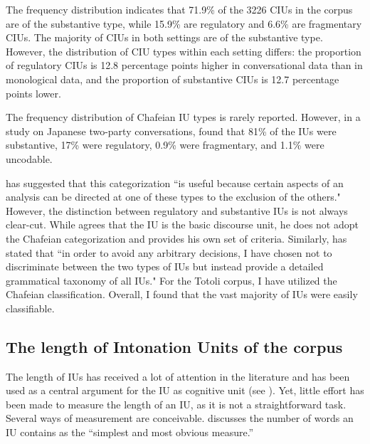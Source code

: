 The frequency distribution indicates that 71.9\% of the 3226 CIUs in the corpus are of the substantive type, while 15.9\% are regulatory and 6.6\% are fragmentary CIUs. The majority of CIUs in both settings are of the substantive type. However, the distribution of CIU types within each setting differs: the proportion of regulatory CIUs is 12.8 percentage points higher in conversational data than in monological data, and the proportion of substantive CIUs is 12.7 percentage points lower.

The frequency distribution of Chafeian IU types is rarely reported. However, in a study on Japanese   two-party conversations, \citet[50]{Matsumoto_2003} found that 81\% of the IUs were substantive, 17\% were regulatory, 0.9\% were fragmentary, and 1.1\% were uncodable.




\citet[63]{chafe1994discourse}  has suggested that this categorization ``is useful because certain aspects of an analysis can be directed at one of these types to the exclusion of the others." However, the distinction between regulatory and substantive IUs is not always clear-cut. While \citet{Croft_1995, Croft_2007} agrees that the IU is the basic discourse unit, he does not adopt the Chafeian categorization and provides his own set of criteria. Similarly, \citet[59]{Tao_1996} has stated that ``in order to avoid any arbitrary decisions, I have chosen not to discriminate between the two types of IUs but instead provide a detailed grammatical taxonomy of all IUs." For the Totoli corpus, I have utilized the Chafeian classification. Overall, I found that the vast majority of IUs were easily classifiable.



\subsection{The length of Intonation Units of the corpus}
\label{sec:the-length-of-intonation-units-of-the-corpus}


The length of IUs has received a lot of attention in the literature and has been used as a central argument for the IU as cognitive unit (see  ). Yet, little effort has been made to measure the length of an IU, as it is not a straightforward task. Several ways of measurement are conceivable. \citet[64]{chafe1994discourse} discusses the number of words an IU contains as the “simplest and most obvious measure.”


